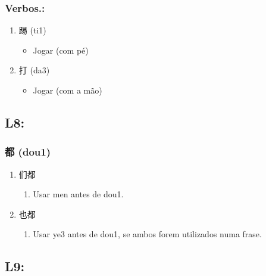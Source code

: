 \documentclass[11pt]{article}
\begin{document}
\subsubsection{Verbos.:}
\label{sec:org60b8b93}
\begin{enumerate}
\item 踢 (ti1)
\begin{itemize}
\item Jogar (com pé)
\end{itemize}

\item 打 (da3)
\begin{itemize}
\item Jogar (com a mão)
\end{itemize}
\end{enumerate}


\subsection{L8:}
\label{sec:org6cec4e2}
\subsubsection{都 (dou1)}
\label{sec:org5a84d1a}
\begin{enumerate}
\item 们都
\label{sec:org238c104}
\begin{enumerate}
\item Usar men antes de dou1.
\end{enumerate}

\item 也都
\label{sec:org46a8eda}
\begin{enumerate}
\item Usar ye3 antes de dou1, se ambos forem utilizados numa frase.
\end{enumerate}
\end{enumerate}


\subsection{L9:}
\label{sec:orgcd7a48e}
\end{document}
